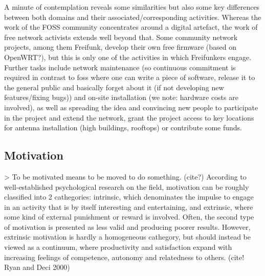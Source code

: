 A minute of contemplation reveals some similarities but also some key differences between both domains and their associated/corresponding activities.
Whereas the work of the FOSS community concentrates around a digital artefact, the work of free network activists extends well beyond that.
Some community network projects, among them Freifunk, develop their own free firmware (based on OpenWRT?), but this is only one of the activities in which Freifunkers engage.
Further tasks include network maintenance (so continuous commitment is required in contrast to foss where one can write a piece of software, release it to the general public and basically forget about it (if not developing new features/fixing bugs)) and on-site installation (we note: hardware costs are involved), as well as spreading the idea and convincing new people to participate in the project and extend the network, grant the project access to key locations for antenna installation (high buildings, rooftops) or contribute some funds.

\subsection{Motivation}
> To be motivated means to be moved to do something. (cite?)
According to well-established psychological research on the field, motivation can be roughly classified into 2 cathegories:
intrinsic, which denominates the impulse to engage in an activity that is by itself interesting and entertaining, and extrinsic, where some kind of external punishment or reward is involved.
Often, the second type of motivation is presented as less valid and producing poorer results.
However, extrinsic motivation is hardly a homogeneous cathegory, but should instead be viewed as a continuum, where productivity and satisfaction expand with increasing feelings of competence, autonomy and relatedness to others. (cite! Ryan and Deci 2000)

\begin{comment}
What is FOSS (really brief, people should know that)
What is Freifunk (slightly less brief, is the new community) <--- that's the focus

Comparison of the domains:
* FOSS: digital products
* community networks:
  ** digital products (the firmware)
  ** hardware costs
  ** network maintanance
  ** network installation on site
  ** talk to people and convince them of the idea in order to
     *** get access to suitable locations
     *** get funds
     *** convince them to install their own routers and extend the network -- ``marketing'' aspect a way more pronounced

What types of motivation are relevant
\end{comment}
